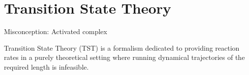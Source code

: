 \chapter{Transition State Theory}
\label{chap:tst}
\bit
\item Misconception: Activated complex
\eit

Transition State Theory (TST) is a formalism dedicated to providing reaction rates in a purely theoretical setting where running dynamical trajectories of the required length is infeasible.

\expand



